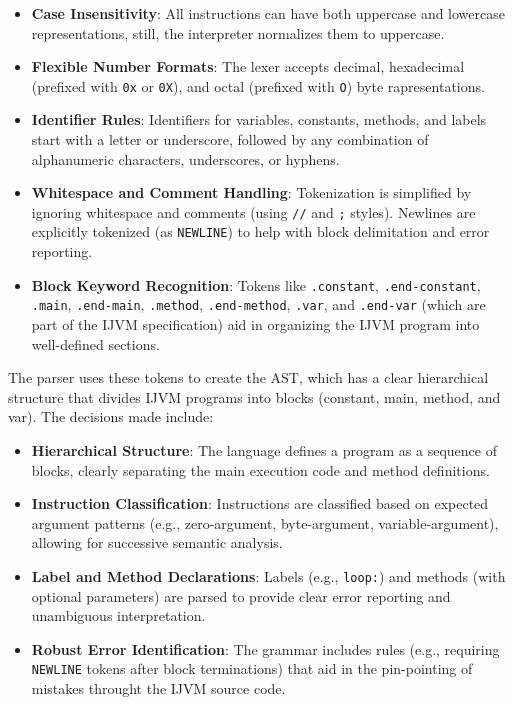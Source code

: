 \documentclass[11pt]{article}
\begin{document}
\begin{itemize}
    \item \textbf{Case Insensitivity}: All instructions can have both uppercase and lowercase representations, still, the interpreter normalizes them to uppercase.
    \item \textbf{Flexible Number Formats}: The lexer accepts decimal, hexadecimal (prefixed with \texttt{0x} or \texttt{0X}), and octal (prefixed with \texttt{O}) byte rapresentations.
	\item \textbf{Identifier Rules}: Identifiers for variables, constants, methods, and labels start with a letter or underscore, followed by any combination of alphanumeric characters, underscores, or hyphens.
    \item \textbf{Whitespace and Comment Handling}: Tokenization is simplified by ignoring whitespace and comments (using \texttt{//} and \texttt{;} styles). Newlines are explicitly tokenized (as \texttt{NEWLINE}) to help with block delimitation and error reporting.
    \item \textbf{Block Keyword Recognition}: Tokens like \texttt{.constant}, \texttt{.end-constant}, \texttt{.main}, \texttt{.end-main}, \texttt{.method}, \texttt{.end-method}, \texttt{.var}, and \texttt{.end-var} (which are part of the IJVM specification) aid in organizing the IJVM program into well-defined sections.
\end{itemize}

The parser uses these tokens to create the AST, which has a clear hierarchical structure that divides IJVM programs into blocks (constant, main, method, and var). The decisions made include:

\begin{itemize}
    \item \textbf{Hierarchical Structure}: The language defines a program as a sequence of blocks, clearly separating the main execution code and method definitions.
    \item \textbf{Instruction Classification}: Instructions are classified based on expected argument patterns (e.g., zero-argument, byte-argument, variable-argument), allowing for successive semantic analysis.
    \item \textbf{Label and Method Declarations}: Labels (e.g., \texttt{loop:}) and methods (with optional parameters) are parsed to provide clear error reporting and unambiguous interpretation.
    \item \textbf{Robust Error Identification}: The grammar includes rules (e.g., requiring \texttt{NEWLINE} tokens after block terminations) that aid in the pin-pointing of mistakes throught the IJVM source code.
\end{itemize}
\end{document}
